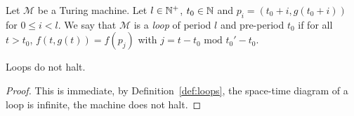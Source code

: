 \begin{definition}[Loops]\label{def:loops}
    Let $\mathcal{M}$ be a Turing machine. Let $l\in\mathbb{N}^+$, $t_0 \in \mathbb{N}$ and $p_i = (t_0+i, g(t_0+i))$ for $0 \leq i < l$. We say that $\mathcal{M}$ is a \textit{loop} of period $l$ and pre-period $t_0$ if for all $t > t_0$, $f(t,g(t)) = f(p_j)$ with $j = t-t_0 \text{ mod } t_0' - t_0$.
\end{definition}

\begin{lemma}\label{lem:loopdonthalt}
    Loops do not halt.
\end{lemma}
\begin{proof} This is immediate, by Definition~\ref{def:loops}, the space-time diagram of a loop is infinite, the machine does not halt.
\end{proof}
\newpage


